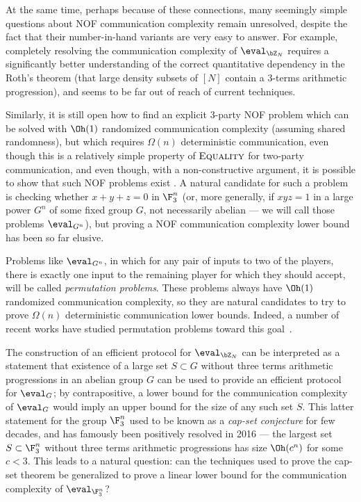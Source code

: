 At the same time, perhaps because of these connections, many seemingly simple questions about NOF communication complexity remain unresolved, despite the fact that their number-in-hand variants are very easy to answer. For example, completely resolving the communication complexity of $\eval_{\bZ_N}$ requires a significantly better understanding of the correct quantitative dependency in the Roth's theorem (that large density subsets of $[N]$ contain a 3-terms arithmetic progression), and seems to be far out of reach of current techniques. 

Similarly, it is still open how to find an explicit $3$-party NOF problem which can be solved with $\Oh(1)$ randomized communication complexity (assuming shared randomness), but  which requires $\Omega(n)$ deterministic communication, even though this is a relatively simple property of $\textsc{Equality}$ for two-party communication, and even though, with a non-constructive argument, it is possible to show that such NOF problems exist \cite{DP08}. A natural candidate for such a problem is checking whether $x+y+z = 0$ in $\F_3^n$ (or, more generally, if $xyz = 1$ in a large power $G^n$ of some fixed group $G$, not necessarily abelian --- we will call those problems $\eval_{G^n}$), but proving a NOF communication complexity lower bound has been so far elusive.

Problems like $\eval_{G^n}$, in which for any pair of inputs to two of the players, there is exactly one input to the remaining player for which they should accept, will be called \emph{permutation problems}. These problems always have $\Oh(1)$ randomized communication complexity, so they are natural candidates to try to prove $\Omega(n)$ deterministic communication lower bounds. Indeed, a number of recent works have studied permutation problems toward this goal~\cite{BDPW10,CFTZ21}.

The construction \cite{CFL83} of an efficient protocol for $\eval_{\bZ_N}$ can be interpreted as a statement that existence of a large set $S \subset G$ without three terms arithmetic progressions in an abelian group $G$ can be used to provide an efficient protocol for $\eval_{G}$; by contrapositive, a lower bound for the communication complexity of $\eval_G$ would imply an upper bound for the size of any such set $S$. This latter statement for the group $\F_3^n$ used to be known as a \emph{cap-set conjecture} for few decades, and has famously been positively resolved in 2016 \cite{ED17,CLP17, T16} --- the largest set $S \subset \F_3^n$ without three terms arithmetic progressions has size $\Oh(c^n)$ for some $c < 3$. This leads to a natural question: can the techniques used to prove the cap-set theorem be generalized to prove a linear lower bound for the communication complexity of $\eval_{\F_3^n}$?

